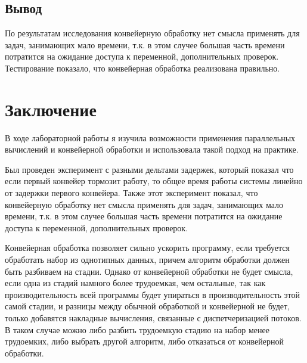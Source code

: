 \documentclass[12pt]{report}
\begin{document}
\section{Вывод}
По результатам исследования конвейерную обработку нет смысла применять для задач, занимающих мало времени, т.к. в этом случее большая часть времени
потратится на ожидание доступа к переменной, дополнительных проверок.
Тестирование показало, что конвейерная обработка реализована правильно.

\chapter*{Заключение}
В ходе лабораторной работы я изучила возможности применения параллельных вычислений и конвейерной обработки и использовала такой подход на практике. 

Был проведен эксперимент с разными дельтами задержек, который показал что если первый конвейер тормозит работу, то общее время работы системы
линейно от задержки первого конвейера. Также этот эксперимент показал, что конвейерную обработку нет смысла применять для задач, занимающих мало времени, т.к. в этом случее большая часть времени потратится на ожидание доступа к переменной, дополнительных проверок.

Конвейерная обработка позволяет сильно ускорить программу, если требуется обработать набор из однотипных данных, причем алгоритм обработки должен быть разбиваем на стадии. Однако от конвейерной обработки не будет смысла, если одна из стадий намного более трудоемкая, чем остальные, так как производительность всей программы будет упираться в производительность этой самой стадии, и разницы между обычной обработкой и конвейерной не будет, только добавятся накладные вычисления, связанные с диспетчеризацией потоков. В таком случае можно либо разбить трудоемкую стадию на набор менее трудоемких, либо выбрать другой алгоритм, либо отказаться от конвейерной обработки.
\end{document}
